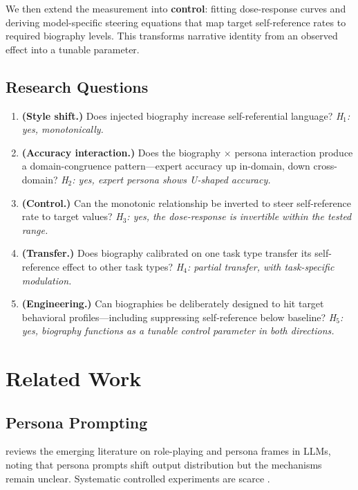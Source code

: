 \documentclass[11pt,a4paper]{article}
\begin{document}
We then extend the measurement into \textbf{control}: fitting dose-response curves and deriving model-specific steering equations that map target self-reference rates to required biography levels. This transforms narrative identity from an observed effect into a tunable parameter.

\subsection{Research Questions}

\begin{enumerate}[label=\textbf{RQ\arabic*}]
\item \textbf{(Style shift.)} Does injected biography increase self-referential language? \textit{H$_1$: yes, monotonically.}
\item \textbf{(Accuracy interaction.)} Does the biography $\times$ persona interaction produce a domain-congruence pattern---expert accuracy up in-domain, down cross-domain? \textit{H$_2$: yes, expert persona shows U-shaped accuracy.}
\item \textbf{(Control.)} Can the monotonic relationship be inverted to steer self-reference rate to target values? \textit{H$_3$: yes, the dose-response is invertible within the tested range.}
\item \textbf{(Transfer.)} Does biography calibrated on one task type transfer its self-reference effect to other task types? \textit{H$_4$: partial transfer, with task-specific modulation.}
\item \textbf{(Engineering.)} Can biographies be deliberately designed to hit target behavioral profiles---including suppressing self-reference below baseline? \textit{H$_5$: yes, biography functions as a tunable control parameter in both directions.}
\end{enumerate}

\section{Related Work}
\label{sec:related}

\subsection{Persona Prompting}
\citet{shanahan2024} reviews the emerging literature on role-playing and persona frames in LLMs, noting that persona prompts shift output distribution but the mechanisms remain unclear. Systematic controlled experiments are scarce \citep{jiang2024}.
\end{document}
